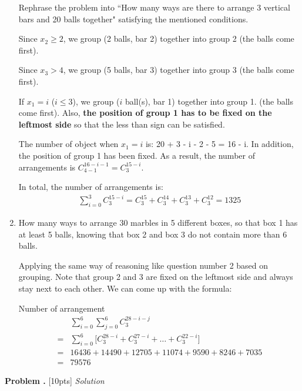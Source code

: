 \documentclass[10pt]{article}
\newcounter{problem}
\newcommand{\problem}{\textbf{\refstepcounter{problem}Problem \theproblem.} }
\begin{document}
\begin{enumerate}
    \par Rephrase the problem into ``How many ways are there to arrange 3 vertical bars and 20 balls
        together" satisfying the mentioned conditions.
    \par Since $x_{2} \geq 2$, we group (2 balls, bar 2) together into group 2 (the balls come first).
    \par Since $x_{3} > 4$, we group (5 balls, bar 3) together into group 3 (the balls come first).
    \par If $x_{1} = i$ ($i \leq 3$), we group ($i$ ball(s), bar 1) together into group 1. (the
        balls come first). Also, \textbf{the position of group 1 has to be fixed on the leftmost
        side} so that the less than sign can be satisfied.
    \par The number of object when $x_{1} = i$ is: 20 + 3 - i - 2 - 5 = 16 - i. In addition, the
        position of group 1 has been fixed. As a result, the number of arrangements is
        $C_{4 - 1}^{16 - i - 1} = C_{3}^{15 - i} $. 
    \par In total, the number of arrangements is:
    \begin{align*}
        \sum_{i = 0}^{3} C_{3}^{15 - i} = C_{3}^{15} + C_{3}^{14} + C_{3}^{13} + C_{3}^{12} = 1325
    \end{align*}

    \item How many ways to arrange 30 marbles in 5 different boxes, so that box 1 has at least 5
        balls, knowing that box 2 and box 3 do not contain more than 6 balls.

    \par Applying the same way of reasoning like question number 2 based on grouping.
        Note that group 2 and 3 are fixed on the leftmost side and always stay next to each other.
        We can come up with the formula:
    \par Number of arrangement
    \begin{align*}
        & \sum_{i = 0}^{6} \sum_{j = 0}^{6} C_{3}^{28 - i - j} \\
        = & \sum_{i = 0}^{6} \bigg[ C_{3}^{28 - i} + C_{3}^{27 - i} + \ldots
        + C_{3}^{22 - i} \bigg] \\
        = & 16436 + 14490 + 12705 + 11074 + 9590 + 8246 + 7035 \\
        = & 79576
    \end{align*}

\end{enumerate}

\clearpage
\problem [10pts]
\bigbreak
\textit{Solution}
\bigbreak
\end{document}
